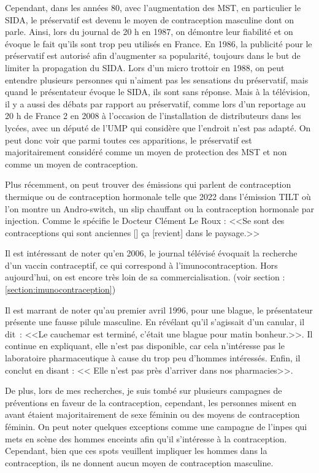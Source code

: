 \documentclass[12pt,a4paper]{report}
\begin{document}
Cependant, dans les années 80, avec l'augmentation des MST, en particulier le SIDA, le préservatif est devenu le moyen de contraception masculine dont on parle. Ainsi, lors du journal de 20 h en 1987, on démontre leur fiabilité et on évoque le fait qu'ils sont trop peu utilisés en France. \cite{EssaisPreservatifsINA} En 1986, la publicité pour le préservatif est autorisé afin d'augmenter sa popularité, toujours dans le but de limiter la propagation du SIDA. \cite{PublicitePreservatifsSida} Lors d'un micro trottoir en 1988, on peut entendre plusieurs personnes qui n'aiment pas les sensations du préservatif, mais quand le présentateur évoque le SIDA, ils sont sans réponse. \cite{DebatPreservatifsDans}
Mais à la télévision, il y a aussi des débats par rapport au préservatif, comme lors d'un reportage au 20 h de France 2 en 2008 à l'occasion de l'installation de distributeurs dans les lycées, avec un député de l'UMP qui considère que l'endroit n'est pas adapté. \cite{DebatPreservatifsDans} On peut donc voir que parmi toutes ces apparitions, le préservatif est majoritairement considéré comme un moyen de protection des MST et non comme un moyen de contraception.

Plus récemment, on peut trouver des émissions qui parlent de contraception thermique ou de contraception hormonale telle que 2022 dans l'émission TILT où l'on montre un Andro-switch, un slip chauffant ou la contraception hormonale par injection. Comme le spécifie le Docteur Clément Le Roux : <<Se sont des contraceptions qui sont anciennes [] ça [revient] dans le paysage.>>\cite{valdeloireContraceptionMasculineConnaissezvous22}

Il est intéressant de noter qu'en 2006, le journal télévisé évoquait la recherche d'un vaccin contraceptif, ce qui correspond à l'imunocontraception. Hors aujourd'hui, on est encore très loin de sa commercialisation. (voir section : \ref{section:imunocontraception}) \cite{ContraceptionMasculinePilule}

Il est marrant de noter qu'au premier avril 1996, pour une blague, le présentateur présente une fausse pilule masculine. En révélant qu'il s'agissait d'un canular, il dit : <<Le cauchemar est terminé, c'était une blague pour matin bonheur.>>. Il continue en expliquant, elle n'est pas disponible, car cela n'intéresse pas le laboratoire pharmaceutique à cause du trop peu d'hommes intéressés. Enfin, il conclut en disant : << Elle n'est pas près d'arriver dans nos pharmacies>>. \cite{PremierePilulePour}

De plus, lors de mes recherches, je suis tombé sur plusieurs campagnes de préventions en faveur de la contraception, cependant, les personnes misent en avant étaient majoritairement de sexe féminin ou des moyens de contraception féminin. \cites{inapolitiqueCampagneContraception2012}{ContraceptionReunionINA}{ContraceptionJeuneFille}{ContraceptionJeuneFemme}{ContraceptionCoupleINA}{ContraceptionDefileINA}{mccannparisINPESContraception2011} On peut noter quelques exceptions comme une campagne de l'inpes qui mets en scène des hommes enceints afin qu'il s'intéresse à la contraception. Cependant, bien que ces spots veuillent impliquer les hommes dans la contraception, ils ne donnent aucun moyen de contraception masculine. \cite{HommesMisEnceintes2010}
\end{document}
